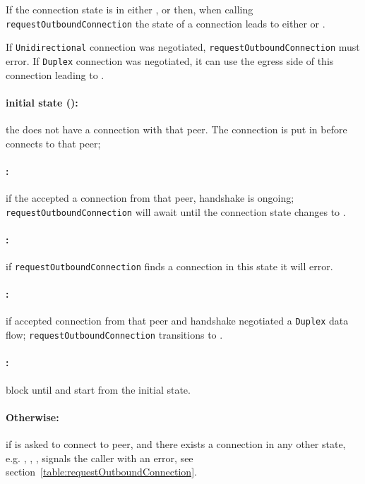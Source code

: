 If the connection state is in either \ReservedOutboundState{},
\UnnegotiatedStateIn{} or \InboundStateDup{} then, when calling
\texttt{requestOutboundConnection} the state of a connection leads to either
\OutboundStateUni{} or \DuplexState{}.

If \texttt{Unidirectional} connection was
negotiated, \texttt{requestOutboundConnection} must error. If \texttt{Duplex}
connection was negotiated, it can use the egress side of this connection leading
to \DuplexState{}.

\paragraph{\textnormal{initial state (\InitialState{})}:} the \connmngr{} does not have
  a connection with that peer. The connection is put in \ReservedOutboundState{}
  before \connmngr{} connects to that peer;

\paragraph{\UnnegotiatedStateIn{}:} if the \connmngr{} accepted
  a connection from that peer, handshake is ongoing;
  \texttt{requestOutboundConnection} will await until the connection state
  changes to \InboundStateAny{}.

\paragraph{\InboundStateUni{}:} if \texttt{requestOutboundConnection} finds
a connection in this state it will error.

\paragraph{\InboundStateDup{}:} if \connmngr{} accepted connection from
  that peer and handshake negotiated a \texttt{Duplex} data flow;
  \texttt{requestOutboundConnection} transitions to \DuplexState{}.

\paragraph{\TerminatingState{}:} block until \TerminatedState{} and start from
the initial state.

\paragraph{\textnormal{Otherwise}:} if \connmngr{} is asked to connect to
peer, and there exists a connection in any other state, e.g.
\UnnegotiatedStateOut{}, \OutboundStateAny{}, \DuplexState{}, \connmngr{} signals the caller with an error, see
section~\ref{table:requestOutboundConnection}.

